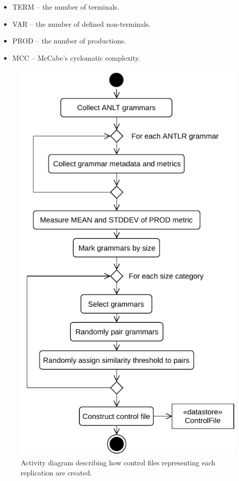 \documentclass[conference]{IEEEtran}
\providecommand{\tightlist}{%
  \setlength{\itemsep}{0pt}\setlength{\parskip}{0pt}}
\begin{document}
\begin{itemize}
\tightlist
\item
  TERM -- the number of terminals.
\item
  VAR -- the number of defined non-terminals.
\item
  PROD -- the number of productions.
\item
  MCC -- McCabe's cyclomatic complexity.
\end{itemize}

\begin{figure}
\hypertarget{fig:selection_process}{%
\centering
\includegraphics{images/paper/select_process_1.pdf}
\caption{Activity diagram describing how control files representing each
replication are created.}\label{fig:selection_process}
}
\end{figure}
\end{document}
